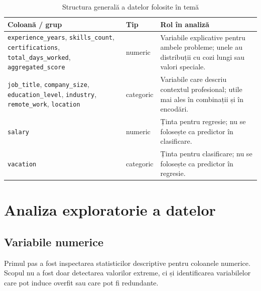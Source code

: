 \documentclass[12pt,a4paper]{article}
\begin{document}
\begin{table}[H]
\centering
\caption{Structura generală a datelor folosite în temă}
\begin{tabular}{p{}p{}p{}}
\toprule
Coloană / grup & Tip & Rol în analiză \\
\midrule
\texttt{experience\_years}, \texttt{skills\_count}, \texttt{certifications}, \texttt{total\_days\_worked}, \texttt{aggregated\_score} & numeric & Variabile explicative pentru ambele probleme; unele au distribuții cu cozi lungi sau valori speciale. \\
\texttt{job\_title}, \texttt{company\_size}, \texttt{education\_level}, \texttt{industry}, \texttt{remote\_work}, \texttt{location} & categoric & Variabile care descriu contextul profesional; utile mai ales în combinații și în encodări. \\
\texttt{salary} & numeric & Ținta pentru regresie; nu se folosește ca predictor în clasificare. \\
\texttt{vacation} & categoric & Ținta pentru clasificare; nu se folosește ca predictor în regresie. \\
\bottomrule
\end{tabular}
\end{table}

\section{Analiza exploratorie a datelor}
\subsection{Variabile numerice}
Primul pas a fost inspectarea statisticilor descriptive pentru coloanele numerice. Scopul nu a fost doar detectarea valorilor extreme, ci și identificarea variabilelor care pot induce overfit sau care pot fi redundante.

\begin{table}[H]
\centering
\caption{Statistici descriptive pentru principalele variabile numerice din train}
\end{table}
\end{document}
